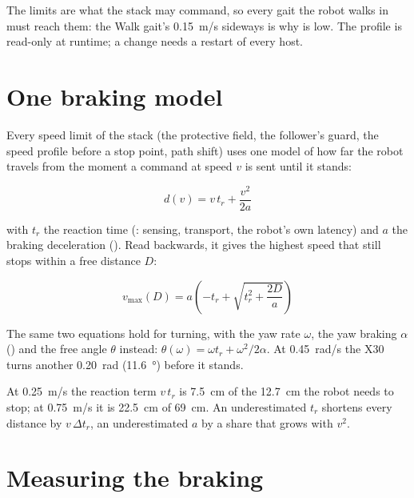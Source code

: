 The limits are what the stack may command, so every gait the robot walks in must reach them:
the Walk gait's \SI{0.15}{m/s} sideways is why  is low. The profile is read-only
at runtime; a change needs a restart of every host.

\section{One braking model}
\label{sec:t-braking}

Every speed limit of the stack (the protective field, the follower's guard, the speed profile
before a stop point, path shift) uses one model of how far the robot travels from the moment a
command at speed $v$ is sent until it stands:

\begin{equation}
  d(v) = v\,t_r + \frac{v^2}{2a}
  \label{eq:t-braking}
\end{equation}

with $t_r$ the reaction time (: sensing, transport, the robot's own
latency) and $a$ the braking deceleration (). Read backwards, it gives the
highest speed that still stops within a free distance $D$:

\begin{equation}
  v_{\max}(D) = a\left(-t_r + \sqrt{t_r^2 + \frac{2D}{a}}\right)
  \label{eq:t-stopping-speed}
\end{equation}

The same two equations hold for turning, with the yaw rate $\omega$, the yaw braking
$\alpha$ () and the free angle $\theta$ instead:
$\theta(\omega) = \omega t_r + \omega^2/2\alpha$. At \SI{0.45}{rad/s} the X30 turns another
\SI{0.20}{rad} (\SI{11.6}{\degree}) before it stands.

\begin{notebox}
At \SI{0.25}{m/s} the reaction term $v\,t_r$ is \SI{7.5}{cm} of the \SI{12.7}{cm} the robot needs
to stop; at \SI{0.75}{m/s} it is \SI{22.5}{cm} of \SI{69}{cm}. An underestimated $t_r$ shortens
every distance by $v\,\Delta t_r$, an underestimated $a$ by a share that grows with $v^2$.
\end{notebox}

\section{Measuring the braking}
\label{sec:t-measure}

